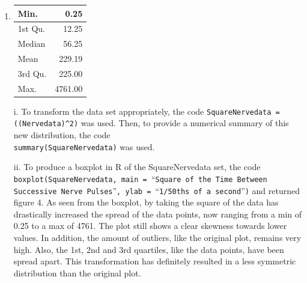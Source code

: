 \documentclass[a4paper]{article}
\newcommand{\code}{\texttt}
\begin{document}
\begin{enumerate}
\begin{enumerate}
	    \bigbreak

		\item
		\begin{adjustbox}{valign=T,raise=0ex,minipage={\linewidth}}
	        \begin{table}
				\begin{tabular}{l|r}
					Min. & 0.25 \\
					\hline
					1st Qu. & 12.25 \\
					\hline
					Median & 56.25 \\
					\hline
					Mean & 229.19 \\
					\hline
					3rd Qu. & 225.00 \\
					\hline
					Max. & 4761.00 \\
				\end{tabular}
			\end{table}

    		i. To transform the data set appropriately, the code \code{SquareNervedata =((Nervedata)\^{}2)} was used. Then, to provide a numerical summary of this new distribution, the code \\\code{summary(SquareNervedata)} was used.

    		\bigbreak

			ii. To produce a boxplot in R of the SquareNervedata set, the code \code{boxplot(SquareNervedata, main = }\enquote{\code{Square of the Time Between Successive Nerve Pulses}}\code{, ylab = }\enquote{\code{1/50ths of a second}}\code{)} and returned figure 4. As seen from the boxplot, by taking the square of the data has drastically increased the spread of the data points, now ranging from a min of 0.25 to a max of 4761. The plot still shows a clear skewness towards lower values. In addition, the amount of outliers, like the original plot, remains very high. Also, the 1st, 2nd and 3rd quartiles, like the data points, have been spread apart. This transformation has definitely resulted in a less symmetric distribution than the original plot. 

	    \end{adjustbox}

	    \bigbreak


\end{enumerate}
\end{enumerate}
\end{document}
